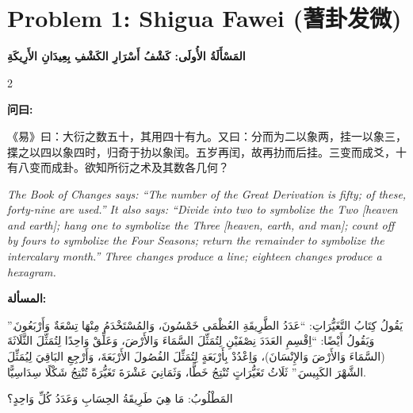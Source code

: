 \documentclass[11pt,a4paper]{article}
\newcommand{\ar}[1]{\arabicfont\beginR #1\endR}
\newcommand{\zhtext}[1]{{\chinese #1}}
\newenvironment{bilingual}{%
  \begin{paracol}{2}
}{%
  \end{paracol}
}
\newcommand{\cnlabel}[1]{\textcolor{algocolor}{\textbf{#1}}}
\newcommand{\arlabel}[1]{\ar{\textcolor{algocolor}{\textbf{#1}}}}
\begin{document}
\newpage

\section{Problem 1: Shigua Fawei (\zhtext{蓍卦发微})}
\ar{\textbf{المَسْأَلَةُ الأُولَى: كَشْفُ أَسْرَارِ الكَشْفِ بِعِيدَانِ الأَرِيكَةِ}}

\begin{bilingual}

\begin{leftcolumn*}
\cnlabel{问曰:}

《易》曰：大衍之数五十，其用四十有九。又曰：分而为二以象两，挂一以象三，揲之以四以象四时，归奇于扐以象闰。五岁再闰，故再扐而后挂。三变而成爻，十有八变而成卦。欲知所衍之术及其数各几何？

\medskip

\textit{The Book of Changes says: ``The number of the Great Derivation is fifty; of these, forty-nine are used.'' It also says: ``Divide into two to symbolize the Two [heaven and earth]; hang one to symbolize the Three [heaven, earth, and man]; count off by fours to symbolize the Four Seasons; return the remainder to symbolize the intercalary month.'' Three changes produce a line; eighteen changes produce a hexagram.}
\end{leftcolumn*}

\begin{rightcolumn*}
\arlabel{المسألة:}

\ar{يَقُولُ كِتَابُ التَّغَيُّرَاتِ: \enquote{عَدَدُ الطَّرِيقَةِ العُظْمَى خَمْسُونَ، وَالمُسْتَخْدَمُ مِنْهَا تِسْعَةٌ وَأَرْبَعُونَ.} وَيَقُولُ أَيْضًا: \enquote{اِقْسِمِ العَدَدَ نِصْفَيْنِ لِتُمَثِّلَ السَّمَاءَ وَالأَرْضَ، وَعَلِّقْ وَاحِدًا لِتُمَثِّلَ الثَّلَاثَةَ (السَّمَاءَ وَالأَرْضَ وَالإِنْسَانَ)، وَاِعْدُدْ بِأَرْبَعَةٍ لِتُمَثِّلَ الفُصُولَ الأَرْبَعَةَ، وَأَرْجِعِ البَاقِيَ لِيُمَثِّلَ الشَّهْرَ الكَبِيسَ.} ثَلَاثُ تَغَيُّرَاتٍ تُنْتِجُ خَطًّا، وَثَمَانِيَ عَشْرَةَ تَغَيُّرَةً تُنْتِجُ شَكْلًا سِدَاسِيًّا.}

\ar{المَطْلُوبُ: مَا هِيَ طَرِيقَةُ الحِسَابِ وَعَدَدُ كُلِّ وَاحِدٍ؟}
\end{rightcolumn*}

\end{bilingual}

\vspace{1em}
\end{document}

